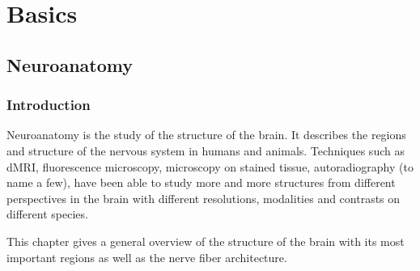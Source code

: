 \newpage\null\thispagestyle{empty}\newpage
\clearpage{\thispagestyle{empty}\cleardoublepage}
\part{Basics}
\parttoc
%
%
%
\cleardoublepage
\setcounter{chapter}{1}
\chapter{Neuroanatomy}
\label{chap:neuro}
%
\section{Introduction}
%
Neuroanatomy is the study of the structure of the brain.
It describes the regions and structure of the nervous system in humans and animals.
Techniques such as \ac{dMRI}, fluorescence microscopy, microscopy on stained tissue, autoradiography (to name a few), have been able to study more and more structures from different perspectives in the brain with different resolutions, modalities and contrasts on different species.
\par
%
This chapter gives a general overview of the structure of the brain with its most important regions as well as the nerve fiber architecture.
%
%
%
